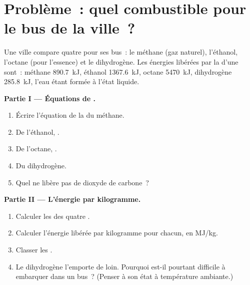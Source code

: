\section{Problème~: quel combustible pour le bus de la ville~?}

\begin{problem}
\label{pb:g11:reaction-energy:1}
Une ville compare quatre  pour ses bus~: le méthane (gaz
naturel), l'éthanol, l'octane (pour l'essence) et le dihydrogène. Les
énergies libérées par la  d'une  sont~: méthane
\qty{890.7}{kJ}, éthanol \qty{1367.6}{kJ}, octane \qty{5470}{kJ},
dihydrogène \qty{285.8}{kJ}, l'eau étant formée à l'état liquide.

\medskip
\noindent\textbf{Partie I --- Équations de .}
\begin{enumerate}
  \item Écrire l'équation de la  du méthane.
  \item De l'éthanol, .
  \item De l'octane, .
  \item Du dihydrogène.
  \item Quel  ne libère pas de dioxyde de carbone~?
\end{enumerate}

\medskip
\noindent\textbf{Partie II --- L'énergie par kilogramme.}
\begin{enumerate}[resume]
  \item Calculer les  des quatre .
  \item Calculer l'énergie libérée par kilogramme pour chacun, en
        \si{MJ/kg}.
  \item Classer les .
  \item Le dihydrogène l'emporte de loin. Pourquoi est-il pourtant
        difficile à embarquer dans un bus~? (Penser à son état à
        température ambiante.)
\end{enumerate}


\end{problem}
